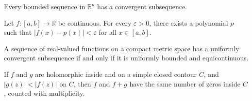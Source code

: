 \documentclass[11pt]{scrartcl}
\providecommand{\eps}{\varepsilon}
\providecommand{\RR}{\mathbb R}
\begin{document}
\begin{theorem}
  Every bounded sequence in $\RR^n$
  has a convergent subsequence.
\end{theorem}

\begin{theorem}
  Let $f \colon [a,b] \to \RR$ be continuous.
  For every $\eps > 0$, there exists a polynomial $p$ such that $|f(x)-p(x)| < \eps$
  for all $x \in [a,b]$.
\end{theorem}

\begin{theorem}
  A sequence of real-valued functions on a compact metric space
  has a uniformly convergent subsequence
  if and only if it is uniformly bounded and equicontinuous.
\end{theorem}

\begin{theorem}
  If $f$ and $g$ are holomorphic inside and on a simple closed contour $C$,
  and $|g(z)| < |f(z)|$ on $C$,
  then $f$ and $f + g$ have the same number of zeros inside $C$,
  counted with multiplicity.
\end{theorem}
\end{document}
